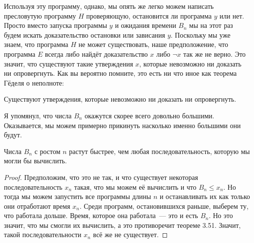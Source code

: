 Используя эту программу, однако, мы опять же легко можем написать пресловутую программу $H$ проверяющую, остановится ли программа $y$ или нет. Просто вместо запуска программы $y$ и ожидания времени $B_n$ мы на этот раз будем искать доказательство остановки или зависания $y$. Поскольку мы уже знаем, что программа $H$ не может существовать, наше предположение, что программа $E$ всегда либо найдёт доказательство $x$ либо $\neg x$ так же не верно. Это значит, что существуют такие утверждения $x$, которые невозможно ни доказать ни опровергнуть. Как вы вероятно помните, это есть ни что иное как теорема Гёделя о неполноте:

\begin{thm}
Существуют утверждения, которые невозможно ни доказать ни опровергнуть.
\end{thm}

Я упомянул, что числа $B_n$ окажутся скорее всего довольно большими. Оказывается, мы можем примерно прикинуть насколько именно большими они будут.

\begin{thm}
Числа $B_n$ с ростом $n$ растут быстрее, чем любая последовательность, которую мы могли бы вычислить.
\end{thm}
\begin{proof}
Предположим, что это не так, и что существует некоторая последовательность $x_n$ такая, что мы можем её вычислить и что $B_n\le x_n$. Но тогда мы можем запустить все программы длины $n$ и останавливать их как только они отработают время $x_n$. Среди программ, остановившихся раньше, выберем ту, что работала дольше. Время, которое она работала~--- это и есть $B_n$. Но это значит, что мы смогли их вычислить, а это противоречит теореме 3.51. Значит, такой последовательности $x_n$ всё же не существует.
\end{proof}